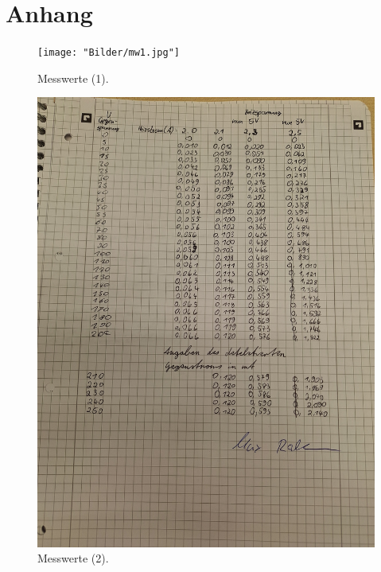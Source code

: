\section{Anhang}
\label{sec:Anhang}

\begin{figure}
    \caption{Messwerte (1).}
    \centering
    \texttt{[image: "Bilder/mw1.jpg"]}
\end{figure}
\begin{figure}
    \caption{Messwerte (2).}
    \centering
    \includegraphics[width=\textwidth, angle=-90]{"Bilder/mw2.jpg"}
\end{figure}
